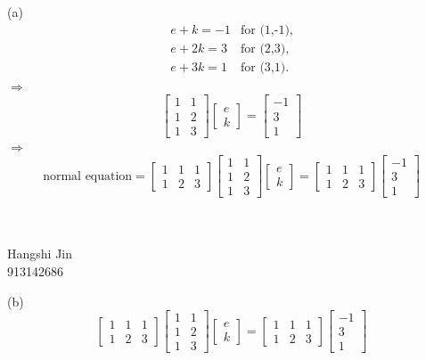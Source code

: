 \documentclass{article}
\begin{document}
\\\\(a)\[\begin{matrix}e+k=-1 &\text{for (1,-1),}\\e+2k=3&\text{for (2,3),}\\e+3k=1&\text{for (3,1).}\end{matrix}\]
$\Rightarrow$\[\begin{bmatrix}1&1\\1&2\\1&3\end{bmatrix}\begin{bmatrix}e\\k\end{bmatrix}=\begin{bmatrix}-1\\3\\1\end{bmatrix}\]
$\Rightarrow$\[\text{normal equation}=\begin{bmatrix}1&1&1\\1&2&3\end{bmatrix}\begin{bmatrix}1&1\\1&2\\1&3\end{bmatrix}\begin{bmatrix}e\\k\end{bmatrix}=\begin{bmatrix}1&1&1\\1&2&3\end{bmatrix}\begin{bmatrix}-1\\3\\1\end{bmatrix}\]
\\\\\begin{flushright}Hangshi Jin \\913142686\end{flushright}
(b)\[\begin{bmatrix}1&1&1\\1&2&3\end{bmatrix}\begin{bmatrix}1&1\\1&2\\1&3\end{bmatrix}\begin{bmatrix}e\\k\end{bmatrix}=\begin{bmatrix}1&1&1\\1&2&3\end{bmatrix}\begin{bmatrix}-1\\3\\1\end{bmatrix}\]
\end{document}
